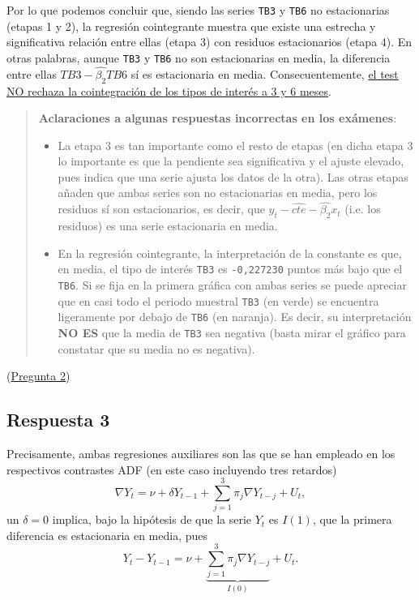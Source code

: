 \documentclass[10pt]{article}
\begin{document}
Por lo que podemos concluir que, siendo las series \texttt{TB3} y \texttt{TB6} no
estacionarias (etapas 1 y 2), la regresión cointegrante muestra que
existe una estrecha y significativa relación entre ellas (etapa 3) con
residuos estacionarios (etapa 4). En otras palabras, aunque \texttt{TB3} y
\texttt{TB6} no son estacionarias en media, la diferencia entre ellas
\(TB3-\widehat{\beta_2}TB6\) sí es estacionaria en
media. Consecuentemente, \uline{el test NO rechaza la cointegración de los
tipos de interés a 3 y 6 meses}.

\begin{quote}
\textbf{Aclaraciones a algunas respuestas incorrectas en los exámenes}:

\begin{itemize}
\item La etapa 3 es tan importante como el resto de etapas (en dicha etapa
3 lo importante es que la pendiente sea significativa y el ajuste
elevado, pues indica que una serie ajusta los datos de la otra). Las
otras etapas añaden que ambas series son no estacionarias en media,
pero los residuos sí son estacionarios, es decir, que
\(y_t-\widehat{cte}-\widehat{\beta_2} x_t\) (i.e. los residuos) es una
serie estacionaria en media.
\item En la regresión cointegrante, la interpretación de la constante es
que, en media, el tipo de interés \texttt{TB3} es \texttt{-0,227230} puntos más
bajo que el \texttt{TB6}. Si se fija en la primera gráfica con ambas series
se puede apreciar que en casi todo el periodo muestral \texttt{TB3} (en
verde) se encuentra ligeramente por debajo de \texttt{TB6} (en naranja). Es
decir, su interpretación \textbf{NO ES} que la media de \texttt{TB3} sea negativa
(basta mirar el gráfico para constatar que su media no es negativa).
\end{itemize}
\end{quote}

(\hyperref[sec:orge2c4c4a]{Pregunta 2})
\subsection*{Respuesta 3}
\label{sec:orgee5b773}

Precisamente, ambas regresiones auxiliares son las que se han empleado
en los respectivos contrastes ADF (en este caso incluyendo tres
retardos) $$\nabla Y_{t} = \nu + \delta Y_{t-1} + \sum_{j=1}^3 \pi_j
\nabla Y_{t-j} + U_t,$$ un \(\delta=0\) implica, bajo la hipótesis de que
la serie \(Y_t\) es \(I(1)\), que la primera diferencia es estacionaria en
media, pues $$Y_{t}-Y_{t-1} = \nu + \underbrace{\sum_{j=1}^3 \pi_j
\nabla Y_{t-j}}_{I(0)} + U_t.$$
\end{document}

